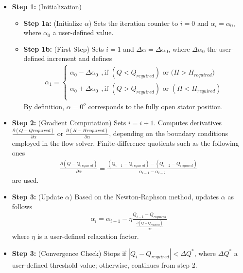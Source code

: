 \begin{itemize}
\item[]{\bf Step 1:}  (Initialization) 
\begin{itemize}
	\item[]{\bf Step 1a:} (Initialize $\alpha$) Sets the iteration counter to $i=0$ and $\alpha_i=\alpha _0$, where $\alpha _0$ a user-defined value.
	\item[]{\bf Step 1b:} (First Step) Sets $i \! = \! 1$ and $\Delta \alpha \! = \! \Delta \alpha_0$, where $\Delta \alpha_0$ the user-defined increment and defines 
\begin{eqnarray}
	\alpha_1={\left\{ 
	\begin{array}{ll}
    \alpha_0 - \Delta \alpha_0 ~~,\mbox{if $(Q < Q_{required})$ or ($H > H_{required})$}\\
	\alpha_0 + \Delta \alpha_0 ~~,\mbox{if $(Q > Q_{required})$ or $(H < H_{required})$}\\
    \end{array} \right. }
    \label{step0}
\end{eqnarray}  
By definition, $\alpha=0^o$ corresponds to the fully open stator position.
\end{itemize}

\item[]{\bf Step 2:}  (Gradient Computation) Sets $i=i+1$. Computes derivatives $\frac{\partial(Q-Q{required})}{\partial \alpha}$ or $\frac{\partial(H-H{required})}{\partial \alpha}$, depending on the boundary conditions employed  in the flow solver. Finite-difference quotients such as the following ones 
\begin{eqnarray}
	\frac{\partial(Q-Q_{required})}{\partial \alpha}=\frac{(Q_{i-1}-Q_{required})-(Q_{i-2}-Q_{required})}{\alpha_{i-1}- \alpha_{i-2}}
\end{eqnarray}  
are used. 

\item[]{\bf Step 3:}  (Update $\alpha$) Based on the Newton-Raphson method, updates $\alpha$ as follows
\begin{eqnarray}
	\alpha_{i}=\alpha_{i-1} - \eta \frac{Q_{i-1}-Q_{required}} {\frac{\partial(Q-Q_{required})}{\partial \alpha}}  
\end{eqnarray}  
where $\eta$ is a user-defined relaxation factor. 

\item[]{\bf Step 3:} (Convergence Check) Stops if $|Q_{i}-Q_{required}|<\Delta Q^*$, where $\Delta Q^*$ a user-defined threshold value; otherwise, continues from step 2. 
\end{itemize}  

